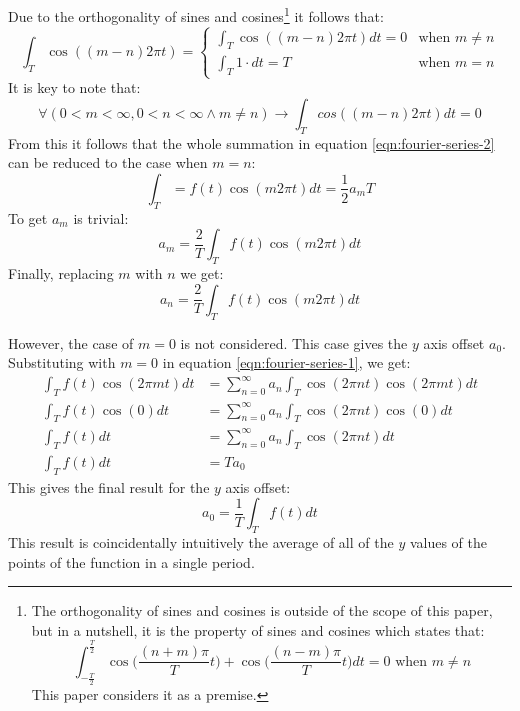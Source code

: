 \documentclass{article}
\begin{document}
Due to the orthogonality of sines and cosines\footnote{The orthogonality of 
	sines and cosines is outside of the scope of this paper, but in a nutshell,
	it is the property of sines and cosines which states that:
	\[
		\int_{-\frac{T}{2}}^{\frac{T}{2}} \cos \bigg(\frac{(n + m) \pi}{T} t \bigg) + \cos \bigg(\frac{(n - m) \pi}{T} t \bigg) dt = 0 \text{ when } m \neq n
	\]
This paper considers it as a premise.} it follows that:
\[
	\int_{T} \cos( (m - n) 2 \pi t) = 
	\begin{cases}
		\int_{T} \cos ( (m -n) 2 \pi t) dt = 0 & \text{when } m \neq n \\
		\int_{T} 1 \cdot dt = T & \text{when } m = n
	\end{cases}
\]
It is key to note that:
$$\forall (0 < m < \infty, 0 < n < \infty \land m \neq n) \rightarrow
\int_{T} cos( (m - n) 2 \pi t) dt = 0$$
From this it follows that the whole summation in equation 
\ref{eqn:fourier-series-2} can be reduced to the case when $m = n$:
$$\int_T = f(t) \cos(m 2 \pi t) dt = \frac{1}{2} a_m T$$
To get $a_m$ is trivial:
\begin{equation*}
	a_m = \frac{2}{T} \int_T f(t) \cos(m 2 \pi t) dt
\end{equation*}
Finally, replacing $m$ with $n$ we get:
\begin{equation}
	a_n = \frac{2}{T} \int_T f(t) \cos(m 2 \pi t) dt
	\label{eqn:fourier-series-amp}
\end{equation}

However, the case of $m = 0$ is not considered. This case gives the $y$ axis 
offset $a_0$. Substituting with $m = 0$ in equation \ref{eqn:fourier-series-1}, 
we get:
$$
\begin{aligned}
\int_{T} f(t) \cos(2 \pi m t) dt &= 
\sum^{\infty}_{n=0} a_n \int_{T} \cos(2 \pi n t) \cos(2 \pi m t) dt \\ 
\int_T f(t) \cos(0) dt &= \sum^{\infty}_{n=0} a_n \int_T \cos(2 \pi n t) \cos(0) dt \\
\int_T f(t) dt &= \sum^{\infty}_{n=0} a_n \int_T \cos(2 \pi n t) dt \\
\int_T f(t) dt &= T a_0
\end{aligned}$$
This gives the final result for the $y$ axis offset:
\begin{equation}
	a_0 = \frac{1}{T} \int_T f(t) dt
	\label{eqn:fourier-series-yoffset}
\end{equation}
This result is coincidentally intuitively the average of all of the $y$ values 
of the points of the function in a single period.
\end{document}
